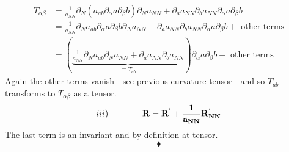 \begin{align}
T_{\alpha\beta} &= \frac{1}{a_{NN}}\partial_N \left(a_{ab}\partial_\alpha a \partial_\beta b\right)\partial_N a_{NN}+\partial_{a} a_{NN}\partial_{b} a_{NN}\partial_{\alpha}a\partial_{\beta} b\\
&= \frac{1}{a_{NN}}\partial_N a_{ab}\partial_\alpha a \partial_\beta b\partial_N a_{NN}+\partial_{a} a_{NN}\partial_{b} a_{NN}\partial_{\alpha}a\partial_{\beta} b +\text{ other terms}\\
&= \left(\underbrace{\frac{1}{a_{NN}}\partial_N a_{ab}\partial_N a_{NN}+\partial_{a} a_{NN}\partial_{b} a_{NN}}_{\equiv T_{ab}}\right)\partial_{\alpha} a\partial_{\beta} b +\text{ other terms}
\end{align}
Again the other terms vanish - see previous curvature tensor - and so $T_{ab}$ transforms to $T_{\alpha\beta}$ as a tensor.
$$iii)\quad\quad\quad\quad \mathbf{R = R^{'}+\frac{1}{a_{NN}} R^{'}_{NN}}$$
The last term is an invariant and by definition  at tensor.
$$\blacklozenge$$
\newpage



